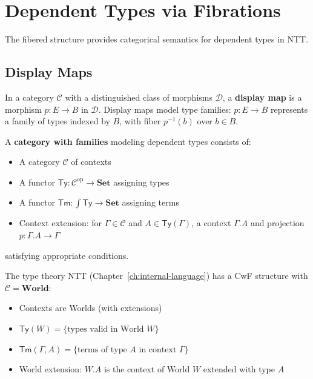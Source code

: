 \section{Dependent Types via Fibrations}
\label{sec:dependent-types-fibrations}

The fibered structure provides categorical semantics for dependent types
in NTT.

\subsection{Display Maps}
\label{subsec:fib-display-maps}

\begin{definition}
\label{def:fib-display-map}
In a category $\mathcal{C}$ with a distinguished class of morphisms
$\mathcal{D}$, a \textbf{display map} is a morphism $p : E \to B$ in $\mathcal{D}$.
Display maps model type families: $p : E \to B$ represents a family of types
indexed by $B$, with fiber $p^{-1}(b)$ over $b \in B$.
\end{definition}

\begin{definition}
\label{def:cwf}
A \textbf{category with families} modeling dependent types consists of:
\begin{itemize}
  \item A category $\mathcal{C}$ of contexts
  \item A functor $\mathsf{Ty} : \mathcal{C}^{\mathrm{op}} \to \mathbf{Set}$ assigning types
  \item A functor $\mathsf{Tm} : \int \mathsf{Ty} \to \mathbf{Set}$ assigning terms
  \item Context extension: for $\Gamma \in \mathcal{C}$ and $A \in \mathsf{Ty}(\Gamma)$,
        a context $\Gamma.A$ and projection $p : \Gamma.A \to \Gamma$
\end{itemize}
satisfying appropriate conditions.
\end{definition}

\begin{proposition}
\label{prop:ntt-cwf-worlds}
The type theory NTT (Chapter~\ref{ch:internal-language}) has a CwF structure
with $\mathcal{C} = \mathbf{World}$:
\begin{itemize}
  \item Contexts are Worlds (with extensions)
  \item $\mathsf{Ty}(W) = \{\text{types valid in World } W\}$
  \item $\mathsf{Tm}(\Gamma, A) = \{\text{terms of type } A \text{ in context } \Gamma\}$
  \item World extension: $W.A$ is the context of World $W$ extended with type $A$
\end{itemize}
\end{proposition}

